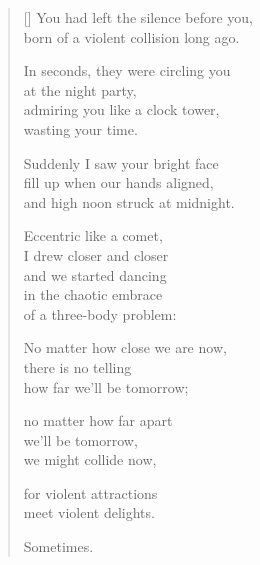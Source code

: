 \documentclass[12pt,a4paper]{article}
\begin{document}
\thispagestyle{empty}


\settowidth{\versewidth}{born of a violent collision long ago.}

\bigskip

\begin{verse}[\versewidth]
You had left the silence before you, \\
born of a violent collision long ago.

In seconds, they were circling you \\
at the night party, \\
admiring you like a clock tower, \\
wasting your time.

Suddenly I saw your bright face \\
fill up when our hands aligned, \\
and high noon struck at midnight.

Eccentric like a comet, \\
I drew closer and closer \\
and we started dancing \\
in the chaotic embrace \\
of a three-body problem:

No matter how close we are now, \\
there is no telling \\
how far we'll be tomorrow;

no matter how far apart \\
we'll be tomorrow, \\
we might collide now,

for violent attractions \\
meet violent delights.

Sometimes.
\end{verse}
\end{document}
